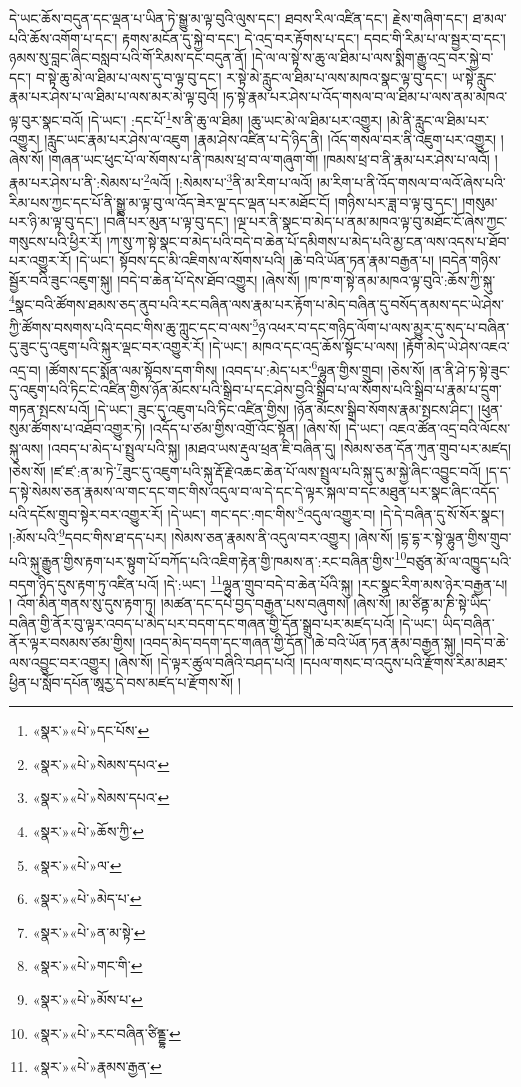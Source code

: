 དེ་ཡང་ཆོས་བདུན་དང་ལྡན་པ་ཡིན་ཏེ་སྒྱུ་མ་ལྟ་བུའི་ལུས་དང་། ཐབས་རིལ་འཛིན་དང་། རྗེས་གཞིག་དང་། ཐ་མལ་པའི་ཆོས་འགོག་པ་དང་། རྟགས་མངོན་དུ་སྐྱེ་བ་དང་། དེ་འདྲ་བར་རྟོགས་པ་དང་། དབང་གི་རིམ་པ་ལ་སྦྱར་བ་དང་། ཉམས་སུ་བླང་ཞིང་བསླབ་པའི་གོ་རིམས་དང་བདུན་ནོ། །དེ་ལ་ལ་སྟེ་ས་ཆུ་ལ་ཐིམ་པ་ལས་སྨིག་རྒྱུ་འདྲ་བར་སྐྱེ་བ་དང་། བ་སྟེ་ཆུ་མེ་ལ་ཐིམ་པ་ལས་དུ་བ་ལྟ་བུ་དང་། ར་སྟེ་མེ་རླུང་ལ་ཐིམ་པ་ལས་མཁའ་སྣང་ལྟ་བུ་དང་། ཡ་སྟེ་རླུང་རྣམ་པར་ཤེས་པ་ལ་ཐིམ་པ་ལས་མར་མེ་ལྟ་བུའོ། །ཧ་སྟེ་རྣམ་པར་ཤེས་པ་འོད་གསལ་བ་ལ་ཐིམ་པ་ལས་ནམ་མཁའ་ལྟ་བུར་སྣང་བའོ། །དེ་ཡང་། :དང་པོ་\footnote{«སྣར་»«པེ་»དང་པོས་}ས་ནི་ཆུ་ལ་ཐིམ། །ཆུ་ཡང་མེ་ལ་ཐིམ་པར་འགྱུར། །མེ་ནི་རླུང་ལ་ཐིམ་པར་འགྱུར། །རླུང་ཡང་རྣམ་པར་ཤེས་ལ་འཇུག །རྣམ་ཤེས་འཛིན་པ་དེ་ཉིད་ནི། །འོད་གསལ་བར་ནི་འཇུག་པར་འགྱུར། །ཞེས་སོ། །གཞན་ཡང་ཕུང་པོ་ལ་སོགས་པ་ནི་ཁམས་ཕྲ་བ་ལ་གཞུག་གོ། །ཁམས་ཕྲ་བ་ནི་རྣམ་པར་ཤེས་པ་ལའོ། །རྣམ་པར་ཤེས་པ་ནི་:སེམས་པ་\footnote{«སྣར་»«པེ་»སེམས་དཔའ་}ལའོ། །:སེམས་པ་\footnote{«སྣར་»«པེ་»སེམས་དཔའ་}ནི་མ་རིག་པ་ལའོ། །མ་རིག་པ་ནི་འོད་གསལ་བ་ལའོ་ཞེས་པའི་རིམ་པས་ཀྱང་དང་པོ་ནི་སྒྱུ་མ་ལྟ་བུ་ལ་འོད་ཟེར་ལྔ་དང་ལྡན་པར་མཐོང་ངོ། །གཉིས་པར་ཟླ་བ་ལྟ་བུ་དང་། །གསུམ་པར་ཉི་མ་ལྟ་བུ་དང་། །བཞི་པར་མུན་པ་ལྟ་བུ་དང་། །ལྔ་པར་ནི་སྣང་བ་མེད་པ་ནམ་མཁའ་ལྟ་བུ་མཐོང་ངོ་ཞེས་ཀྱང་གསུངས་པའི་ཕྱིར་རོ། །ཀ་སུ་ཀ་སྟེ་སྣང་བ་མེད་པའི་བདེ་བ་ཆེན་པོ་དམིགས་པ་མེད་པའི་མྱ་ངན་ལས་འདས་པ་ཐོབ་པར་འགྱུར་རོ། །དེ་ཡང་། སྟོབས་དང་མི་འཇིགས་ལ་སོགས་པའི། །ཆེ་བའི་ཡོན་ཏན་རྣམ་བརྒྱན་པ། །བདེན་གཉིས་སྦྱོར་བའི་ཟུང་འཇུག་སྐུ། །བདེ་བ་ཆེན་པོ་དེས་ཐོབ་འགྱུར། །ཞེས་སོ། །ཁ་ཁ་ག་སྟེ་ནམ་མཁའ་ལྟ་བུའི་:ཆོས་ཀྱི་སྐུ་\footnote{«སྣར་»«པེ་»ཆོས་ཀྱི་}སྣང་བའི་ཚོགས་ཐམས་ཅད་ནུབ་པའི་རང་བཞིན་ལས་རྣམ་པར་རྟོག་པ་མེད་བཞིན་དུ་བསོད་ནམས་དང་ཡེ་ཤེས་ཀྱི་ཚོགས་བསགས་པའི་དབང་གིས་ཆུ་ཀླུང་དང་བ་ལས་\footnote{«སྣར་»«པེ་»ལ་}ཉ་འཕར་བ་དང་གཉིད་ལོག་པ་ལས་མྱུར་དུ་སད་པ་བཞིན་དུ་ཟུང་དུ་འཇུག་པའི་སྐུར་ལྡང་བར་འགྱུར་རོ། །དེ་ཡང་། མཁའ་དང་འདྲ་ཆོས་སྟོང་པ་ལས། །རྟོག་མེད་ཡེ་ཤེས་འཇའ་འདྲ་བ། །ཚོགས་དང་སྨོན་ལམ་སྟོབས་དག་གིས། །འབད་པ་:མེད་པར་\footnote{«སྣར་»«པེ་»མེད་པ་}ལྷུན་གྱིས་གྲུབ། །ཅེས་སོ། །ན་ནི་ཤེ་ཏ་སྟེ་ཟུང་དུ་འཇུག་པའི་ཏིང་ངེ་འཛིན་གྱིས་ཉོན་མོངས་པའི་སྒྲིབ་པ་དང་ཤེས་བྱའི་སྒྲིབ་པ་ལ་སོགས་པའི་སྒྲིབ་པ་རྣམ་པ་དྲུག་གཏན་སྤངས་པའོ། །དེ་ཡང་། ཟུང་དུ་འཇུག་པའི་ཏིང་འཛིན་གྱིས། །ཉོན་མོངས་སྒྲིབ་སོགས་རྣམ་སྤངས་ཤིང་། །ཕུན་སུམ་ཚོགས་པ་འཐོབ་འགྱུར་ཏེ། །འདོད་པ་ཙམ་གྱིས་འགྲོ་འོང་སྟོན། །ཞེས་སོ། །དེ་ཡང་། འཇའ་ཚོན་འདྲ་བའི་ལོངས་སྐུ་ལས། །འབད་པ་མེད་པ་སྤྲུལ་པའི་སྐུ། །མཐའ་ཡས་རྡུལ་ཕྲན་ཇི་བཞིན་དུ། །སེམས་ཅན་དོན་ཀུན་གྲུབ་པར་མཛད། །ཅེས་སོ། །ཛ་ཛ་:ན་མ་ཏེ་\footnote{«སྣར་»«པེ་»ན་མ་སྟེ་}ཟུང་དུ་འཇུག་པའི་སྐུ་རྡོ་རྗེ་འཆང་ཆེན་པོ་ལས་སྤྲུལ་པའི་སྐུ་དུ་མ་སྐྱེ་ཞིང་འབྱུང་བའོ། །ད་ད་ད་སྟེ་སེམས་ཅན་རྣམས་ལ་གང་དང་གང་གིས་འདུལ་བ་ལ་དེ་དང་དེ་ལྟར་སྐལ་བ་དང་མཐུན་པར་སྣང་ཞིང་འདོད་པའི་དངོས་གྲུབ་སྟེར་བར་འགྱུར་རོ། །དེ་ཡང་། གང་དང་:གང་གིས་\footnote{«སྣར་»«པེ་»གང་གི་}འདུལ་འགྱུར་བ། །དེ་དེ་བཞིན་དུ་སོ་སོར་སྣང་། །:མོས་པའི་\footnote{«སྣར་»«པེ་»མོས་པ་}དབང་གིས་ཐ་དད་པར། །སེམས་ཅན་རྣམས་ནི་འདུལ་བར་འགྱུར། །ཞེས་སོ། །དྷ་དྷ་ར་སྟེ་ལྷུན་གྱིས་གྲུབ་པའི་སྐུ་རྒྱུན་གྱིས་རྟག་པར་སྟུག་པོ་བཀོད་པའི་འཇིག་རྟེན་གྱི་ཁམས་ན་:རང་བཞིན་གྱིས་\footnote{«སྣར་»«པེ་»རང་བཞིན་ཙིནྡྷ་}བཙུན་མོ་ལ་འཁྱུད་པའི་བདག་ཉིད་དུས་རྟག་ཏུ་འཛིན་པའོ། །དེ་:ཡང་། \footnote{«སྣར་»«པེ་»རྣམས་རྒྱན་}ལྷུན་གྲུབ་བདེ་བ་ཆེན་པོའི་སྐུ། །རང་སྣང་རིག་མས་ཉེར་བརྒྱན་པ། །
འོག་མིན་གནས་སུ་དུས་རྟག་ཏུ། །མཚན་དང་དཔེ་བྱད་བརྒྱན་པས་བཞུགས། །ཞེས་སོ། །མ་ཙིནྟ་མ་ཎི་སྟེ་ཡིད་བཞིན་གྱི་ནོར་བུ་ལྟར་འབད་པ་མེད་པར་བདག་དང་གཞན་གྱི་དོན་སྒྲུབ་པར་མཛད་པའོ། །དེ་ཡང་། ཡིད་བཞིན་ནོར་ལྟར་བསམས་ཙམ་གྱིས། །འབད་མེད་བདག་དང་གཞན་གྱི་དོན། །ཆེ་བའི་ཡོན་ཏན་རྣམ་བརྒྱན་སྐུ། །བདེ་བ་ཆེ་ལས་འབྱུང་བར་འགྱུར། །ཞེས་སོ། །དེ་ལྟར་ཚུལ་བཞིའི་བཤད་པའོ། །དཔལ་གསང་བ་འདུས་པའི་རྫོགས་རིམ་མཐར་ཕྱིན་པ་སློབ་དཔོན་ཨཱརྱ་དེ་བས་མཛད་པ་རྫོགས་སོ། ། 